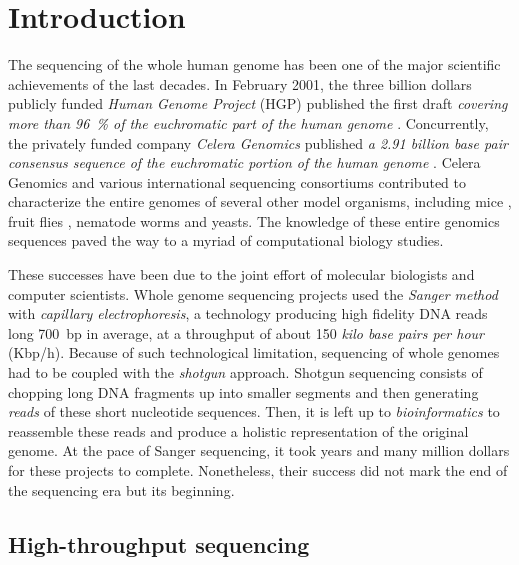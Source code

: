 \chapter{Introduction}

The sequencing of the whole human genome has been one of the major scientific achievements of the last decades.
In February 2001, the three billion dollars publicly funded \emph{Human Genome Project} (HGP) published the first draft \emph{covering more than 96~\% of the euchromatic part of the human genome} \citep{Consortium2001}.
Concurrently, the privately funded company \emph{Celera Genomics} published \emph{a 2.91 billion base pair consensus sequence of the euchromatic portion of the human genome} \citep{Venter2001}.
Celera Genomics and various international sequencing consortiums contributed to characterize the entire genomes of several other model organisms, including mice \citep{Chinwalla2002}, fruit flies \citep{Myers2000}, nematode worms \citep{Sulston1992} and yeasts.
The knowledge of these entire genomics sequences paved the way to a myriad of computational biology studies.

These successes have been due to the joint effort of molecular biologists and computer scientists.
Whole genome sequencing projects used the \emph{Sanger method} \citep{Sanger1977} with \emph{capillary electrophoresis}, a technology producing high fidelity DNA reads long 700~bp in average, at a throughput of about 150 \emph{kilo base pairs per hour} (Kbp/h).
Because of such technological limitation, sequencing of whole genomes had to be coupled with the \emph{shotgun} approach.
Shotgun sequencing consists of chopping long DNA fragments up into smaller segments and then generating \emph{reads} of these short nucleotide sequences.
Then, it is left up to \emph{bioinformatics} to reassemble these reads and produce a holistic representation of the original genome.
At the pace of Sanger sequencing, it took years and many million dollars for these projects to complete.
Nonetheless, their success did not mark the end of the sequencing era but its beginning.


\section{High-throughput sequencing}

